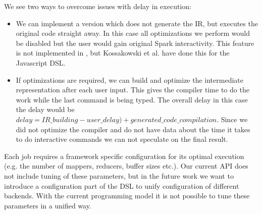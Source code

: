 We see two ways to overcome issues with delay in execution:
\begin{itemize}
\item We can implement a version which does not generate the IR, but executes the original code straight away. In this case all optimizations we perform would be disabled but the user would gain original Spark interactivity. This feature is not implemented in \tool, but Kossakowski et al. \cite{greg} have done this for the Javascript DSL.

\item If optimizations are required,  we can build and optimize the intermediate representation after each user input. This gives the compiler time to do the work while the last command is being typed. The overall delay in this case the delay would be $delay = IR\_building - user\_delay) + generated\_code\_compilation$. Since we did not optimize the compiler and do not have data about the time it takes to do interactive commands we can not speculate on the final result.
\end{itemize}

Each job requires a framework specific configuration for its optimal execution (e.g. the number of mappers, reducers, buffer sizes etc.). Our current API does not include tuning of these parameters, but in the future work we want to introduce a configuration part of the DSL to unify configuration of different backends.
With the current programming model it is not possible to tune these parameters in a unified way. 
